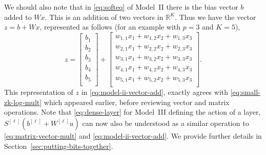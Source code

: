 We should also note that in \eqref{eq:softeq} of Model~II there is the bias vector $b$ added to $Wx$. This is an addition of two vectors in ${\mathbb R}^K$. Thus we have the vector $z = b + Wx$, represented as follows (for an example with $p=3$ and $K=5$),
%
\begin{equation}
\label{eq:model-ii-vector-add} 
z = 
\begin{bmatrix}
b_1 \\
b_2 \\
b_3 \\
b_4 \\
b_5 \\
\end{bmatrix}
+
\begin{bmatrix}
w_{1,1}x_1 + w_{1,2} x_2 + w_{1,3} x_3 \\
w_{2,1}x_1 + w_{2,2} x_2 + w_{2,3} x_3\\
w_{3,1}x_1 + w_{3,2} x_2 + w_{3,3} x_3\\
w_{4,1}x_1 + w_{4,2} x_2 + w_{4,3} x_3\\
w_{5,1}x_1 + w_{5,2} x_2 + w_{5,3} x_3\\
\end{bmatrix}.
\end{equation}
%
This representation of $z$ in \eqref{eq:model-ii-vector-add}, exactly agrees with \eqref{eq:small-zk-log-mult} which appeared earlier, before reviewing vector and matrix operations. Note that \eqref{eq:dense-layer} for Model~III defining the action of a layer, $S^{[\ell]}(b^{[\ell]} + W^{[\ell]} u)$ can now also be understood as a similar operation to \eqref{eq:matrix-vector-mult} and \eqref{eq:model-ii-vector-add}. We provide further details in Section~\ref{sec:putting-bits-together}.
